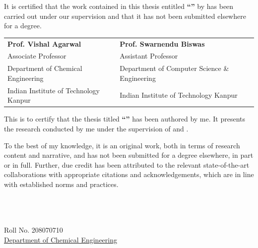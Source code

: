 \documentclass[11pt, a4paper, oneside]{Thesis} %
\begin{document}
\begin{minipage}{1.0\textwidth}
    
    It is certified that the work contained in this thesis entitled \textbf{\enquote{\ttitle}} by \textbf{\authornames} has been carried out under our supervision and that it has not been submitted elsewhere for a degree.
        
\end{minipage}

\vspace{45mm}

\begin{tabular}{@{}p{}@{}p{}@{}}
    \textbf{Prof. Vishal Agarwal} & \textbf{Prof. Swarnendu Biswas} \\
    Associate Professor & Assistant Professor \\
    Department of Chemical Engineering & Department of Computer Science \& Engineering \\
    Indian Institute of Technology Kanpur & Indian Institute of Technology Kanpur \\
\end{tabular}

\vfill
\clearpage %

This is to certify that the thesis titled \textbf{``\ttitle''} has been authored by me. It presents the research conducted by me under the supervision of \textbf{\supnameA} and \textbf{\supnameB}.\par

To the best of my knowledge, it is an original work, both in terms of research content and narrative, and has not been submitted for a degree elsewhere, in part or in full. Further, due credit has been attributed to the relevant state-of-the-art collaborations with appropriate citations and acknowledgements, which are in line with established norms and practices.\\ [2cm]
\\
\\
\begin{minipage}{.5\textwidth}
		\begin{flushleft}
			{\authornames\\ Roll No. 208070710 \\
			\normalsize{\href{http://www.iitk.ac.in/che}{Department of Chemical Engineering}\\
			\univname}}
		\end{flushleft}
\end{minipage}
\vfill
\end{document}
